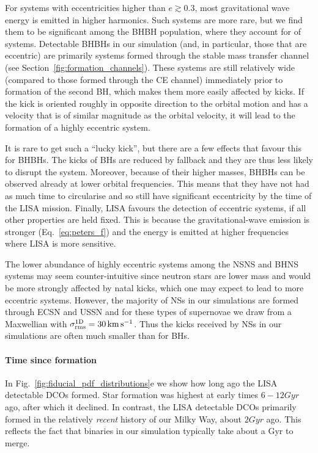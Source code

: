For systems with eccentricities higher than $e\gtrsim0.3$, most gravitational wave energy is emitted in higher harmonics. Such systems are more rare, but we find them to be significant among the BHBH population, where they account for \BHBHHighlyEccentric{} of systems. Detectable BHBHs in our simulation (and, in particular, those that are eccentric) are primarily systems formed through the stable mass transfer channel (see Section~\ref{fig:formation_channels}). These systems are still relatively wide (compared to those formed through the CE channel) immediately prior to formation of the second BH, which makes them more easily affected by kicks. If the kick is oriented roughly in opposite direction to the orbital motion and has a velocity that is of similar magnitude as the orbital velocity, it will lead to the formation of a highly eccentric system. 

It is rare to get such a ``lucky kick'', but there are a few effects that favour this for BHBHs. The kicks of BHs are reduced by fallback and they are thus less likely to disrupt the system. Moreover, because of their higher masses, BHBHs can be observed already at lower orbital frequencies. This means that they have not had as much time to circularise and so still have significant eccentricity by the time of the LISA mission. Finally, LISA favours the detection of eccentric systems, if all other properties are held fixed. This is because the gravitational-wave emission is stronger (Eq.~\ref{eq:peters_f}) and the energy is emitted at higher frequencies \citep[Eq.~20]{Peters+1963} where LISA is more sensitive.

The lower abundance of highly eccentric systems among the NSNS and BHNS systems may seem counter-intuitive since neutron stars are lower mass and would be more strongly affected by natal kicks, which one may expect to lead to more eccentric systems. However, the majority of NSs in our simulations are formed through ECSN and USSN and for these types of supernovae we draw from a Maxwellian with $\sigma_{\rm rms}^{\rm 1D} = 30 \unit{km}{s^{-1}}$. Thus the kicks received by NSs in our simulations are often much smaller than for BHs.

\paragraph{Time since formation} 
In Fig.~\ref{fig:fiducial_pdf_distributions}e we show how long ago the LISA detectable DCOs formed. Star formation was highest at early times $6-12\unit{Gyr}$ ago, after which it declined. In contrast, the LISA detectable DCOs primarily formed in the relatively \textit{recent} history of our Milky Way, about $2 \unit{Gyr}$ ago. This reflects the fact that binaries in our simulation typically take about a Gyr to merge.


